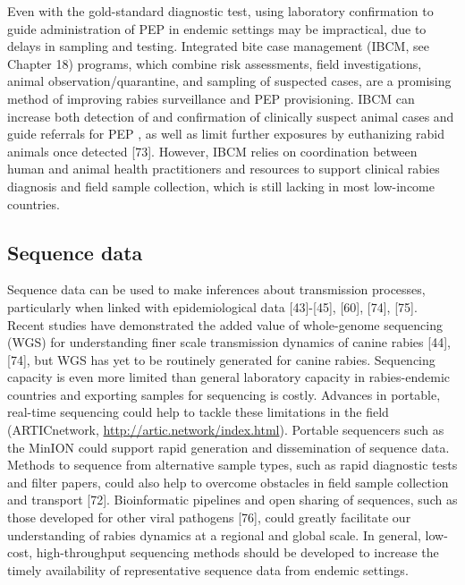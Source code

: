 \documentclass[
]{book}
\begin{document}
Even with the gold-standard diagnostic test, using laboratory
confirmation to guide administration of PEP in endemic settings may be
impractical, due to delays in sampling and testing. Integrated bite case
management (IBCM, see Chapter 18) programs, which combine risk
assessments, field investigations, animal observation/quarantine, and
sampling of suspected cases, are a promising method of improving rabies
surveillance and PEP provisioning. IBCM can increase both detection of
and confirmation of clinically suspect animal cases and guide referrals
for PEP , as well as limit further exposures by euthanizing rabid
animals once detected {[}73{]}. However, IBCM relies on coordination
between human and animal health practitioners and resources to support
clinical rabies diagnosis and field sample collection, which is still
lacking in most low-income countries.

\hypertarget{sequence-data}{%
\subsection{Sequence data}\label{sequence-data}}

Sequence data can be used to make inferences about transmission
processes, particularly when linked with epidemiological data
{[}43{]}-{[}45{]}, {[}60{]}, {[}74{]}, {[}75{]}. Recent studies have demonstrated
the added value of whole-genome sequencing (WGS) for understanding finer
scale transmission dynamics of canine rabies {[}44{]}, {[}74{]}, but WGS has
yet to be routinely generated for canine rabies. Sequencing capacity is
even more limited than general laboratory capacity in rabies-endemic
countries and exporting samples for sequencing is costly. Advances in
portable, real-time sequencing could help to tackle these limitations in
the field (ARTICnetwork, \url{http://artic.network/index.html}). Portable
sequencers such as the MinION could support rapid generation and
dissemination of sequence data. Methods to sequence from alternative
sample types, such as rapid diagnostic tests and filter papers, could
also help to overcome obstacles in field sample collection and transport
{[}72{]}. Bioinformatic pipelines and open sharing of sequences, such as
those developed for other viral pathogens {[}76{]}, could greatly
facilitate our understanding of rabies dynamics at a regional and global
scale. In general, low-cost, high-throughput sequencing methods should
be developed to increase the timely availability of representative
sequence data from endemic settings.
\end{document}
